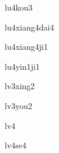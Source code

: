 \begin{multicols}{2}
\begin{verbete}[路口]{lu4kou3}
\end{verbete}

\begin{verbete}[录像带]{lu4xiang4dai4}
\end{verbete}

\begin{verbete}[录像机]{lu4xiang4ji1}
\end{verbete}

\begin{verbete}[录音机]{lu4yin1ji1}
\end{verbete}

\begin{verbete}[旅行]{lv3xing2}
\end{verbete}

\begin{verbete}[旅游]{lv3you2}
\end{verbete}

\begin{verbete}[绿]{lv4}
\end{verbete}

\begin{verbete}[绿色]{lv4se4}
\end{verbete}

\end{multicols}
